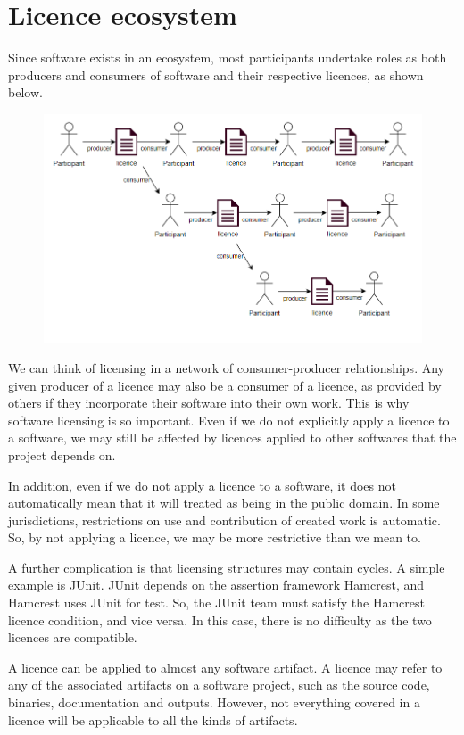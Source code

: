 \documentclass[a4paper, openany]{memoir}
\begin{document}
\section{Licence ecosystem}
Since software exists in an ecosystem, most participants undertake roles as both producers and consumers of software and their respective licences, as shown below.
\begin{figure}[H]
    \centering
    \includegraphics[scale=0.6]{src/17.1 licence ecosystem.PNG}
\end{figure}
\noindent We can think of licensing in a network of consumer-producer relationships. Any given producer of a licence may also be a consumer of a licence, as provided by others if they incorporate their software into their own work. This is why software licensing is so important. Even if we do not explicitly apply a licence to a software, we may still be affected by licences applied to other softwares that the project depends on.

In addition, even if we do not apply a licence to a software, it does not automatically mean that it will treated as being in the public domain. In some jurisdictions, restrictions on use and contribution of created work is automatic. So, by not applying a licence, we may be more restrictive than we mean to.

A further complication is that licensing structures may contain cycles. A simple example is JUnit. JUnit depends on the assertion framework Hamcrest, and Hamcrest uses JUnit for test. So, the JUnit team must satisfy the Hamcrest licence condition, and vice versa. In this case, there is no difficulty as the two licences are compatible.

A licence can be applied to almost any software artifact. A licence may refer to any of the associated artifacts on a software project, such as the source code, binaries, documentation and outputs. However, not everything covered in a licence will be applicable to all the kinds of artifacts.
\end{document}
